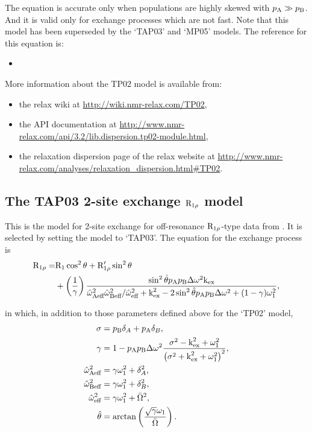 The equation is accurate only when populations are highly skewed with $p_{\textrm{A}} \gg p_{\textrm{B}}$.
And it is valid only for exchange processes which are not fast.
Note that this model has been superseded by the `TAP03' and `MP05' models.
The reference for this equation is:
\begin{itemize}
  \item {}
\end{itemize}

More information about the TP02 model is available from:
\begin{itemize}
  \item the relax wiki at \url{http://wiki.nmr-relax.com/TP02},
  \item the API documentation at \url{http://www.nmr-relax.com/api/3.2/lib.dispersion.tp02-module.html},
  \item the relaxation dispersion page of the relax website at \url{http://www.nmr-relax.com/analyses/relaxation\_dispersion.html#TP02}.
\end{itemize}



\subsection{The TAP03 2-site exchange $\mathrm{R}_{1\rho}$ model}
\label{sect: dispersion: TAP03 model}

This is the model for 2-site exchange for off-resonance $\mathrm{R}_{1\rho}$-type data from \citet{Trott03}.
It is selected by setting the model to `TAP03'.
The equation for the exchange process is
\begin{align}
    \mathrm{R}_{1\rho} = & \mathrm{R}_1\cos^2\theta + \mathrm{R}_{1\rho}'\sin^2\theta \nonumber \\
               & + \left( \frac{1}{\gamma} \right) 
                        \frac{\sin^2\hat\theta p_{\textrm{A}}p_{\textrm{B}}\Delta\omega^2\textrm{k}_{\textrm{ex}}}{\hat\omega_\textrm{Aeff}^2\hat\omega_\textrm{Beff}^2/\hat\omega_\textrm{eff}^2 + \textrm{k}_{\textrm{ex}}^2 - 2\sin^2\hat\theta p_{\textrm{A}}p_{\textrm{B}}\Delta\omega^2 + (1 - \gamma)\omega_1^2},
\end{align}

in which, in addition to those parameters defined above for the `TP02' model,
\begin{subequations}
\begin{align}
    \sigma &= p_{\textrm{B}}\delta_A + p_{\textrm{A}}\delta_B, \\
    \gamma &= 1 - p_{\textrm{A}}p_{\textrm{B}}\Delta\omega^2 \frac{\sigma^2 - \textrm{k}_{\textrm{ex}}^2 + \omega_1^2}{\left( \sigma^2 + \textrm{k}_{\textrm{ex}}^2 + \omega_1^2 \right)^2}, \\
    \hat\omega_\textrm{Aeff}^2 &= \gamma\omega_1^2 + \delta_A^2, \\
    \hat\omega_\textrm{Beff}^2 &= \gamma\omega_1^2 + \delta_B^2, \\
    \hat\omega_\textrm{eff}^2 &= \gamma\omega_1^2 + \bar\Omega^2, \\
    \hat\theta &= \arctan \left( \frac{\sqrt{\gamma}\omega_1}{\bar\Omega} \right).
\end{align}
\end{subequations}

